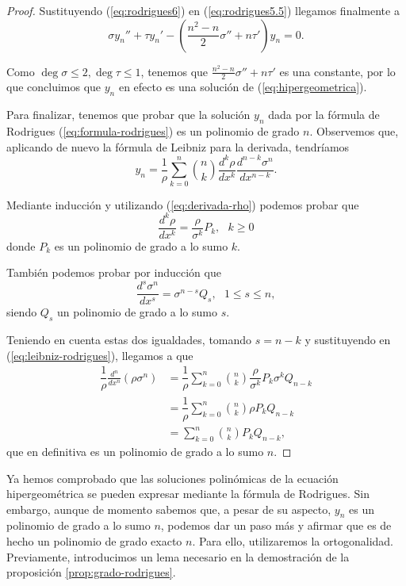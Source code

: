 \begin{proof}
    Sustituyendo (\ref{eq:rodrigues6}) en (\ref{eq:rodrigues5.5}) llegamos finalmente a 
    \begin{equation}
        \sigma y_n'' + \tau y_n' - \left(\frac{n^2-n}{2}\sigma'' + n\tau' \right)y_n =0.
    \end{equation}
    
    Como $\deg\sigma\leq 2,  \deg\tau\leq 1$, tenemos que $\frac{n^2-n}{2}\sigma'' + n\tau'$ es una constante, por lo que concluimos que $y_n$ en efecto es una solución de (\ref{eq:hipergeometrica}).
    
    Para finalizar, tenemos que probar que la solución $y_n$ dada por la fórmula de Rodrigues (\ref{eq:formula-rodrigues}) es un polinomio de grado $n$. Observemos que, aplicando de nuevo la fórmula de Leibniz para la derivada, tendríamos
    \begin{equation}
        \label{eq:leibniz-rodrigues}
        y_n = \frac 1 \rho \sum_{k=0}^n \binom{n}{k} \frac{d^k \rho}{d x^k} \frac{d^{n-k} \sigma^n}{d x^{n-k}}.
    \end{equation}

    Mediante inducción y utilizando (\ref{eq:derivada-rho}) podemos probar que
    $$
    \frac{d^k \rho}{d x^k} = \dfrac\rho{\sigma^k} P_k, \ \ \ k\geq 0
    $$
    donde $P_k$ es un polinomio de grado a lo sumo $k$. 

    También podemos probar por inducción que
    $$
    \frac{d^s \sigma^n}{d x^s} = \sigma^{n-s} Q_s, \ \ \ 1\leq s \leq n,
    $$
    siendo $Q_s$ un polinomio de grado a lo sumo $s$. 

    Teniendo en cuenta estas dos igualdades, tomando $s=n-k$ y sustituyendo en (\ref{eq:leibniz-rodrigues}), llegamos a que 
    \begin{equation}
        \begin{split}
            \dfrac 1 \rho \frac{d^n }{d x^n}(\rho \sigma^n) &= \dfrac 1 \rho  \sum_{k=0}^n \binom{n}{k}  \dfrac\rho{\sigma^k} P_k \sigma^{k} Q_{n-k} \\
            &= \dfrac 1 \rho \sum_{k=0}^n \binom{n}{k} \rho P_k Q_{n-k} \\
            &= \sum_{k=0}^n \binom{n}{k} P_k Q_{n-k},
        \end{split}
    \end{equation}
    que en definitiva es un polinomio de grado a lo sumo $n$.

\end{proof}

Ya hemos comprobado que las soluciones polinómicas de la ecuación hipergeométrica se pueden expresar mediante la fórmula de Rodrigues. Sin embargo, aunque de momento sabemos que, a pesar de su aspecto, $y_n$ es un polinomio de grado a lo sumo $n$, podemos dar un paso más y afirmar que es de hecho un polinomio de grado exacto $n$. Para ello, utilizaremos la ortogonalidad. Previamente, introducimos un lema necesario en la demostración de la proposición \ref{prop:grado-rodrigues}.

